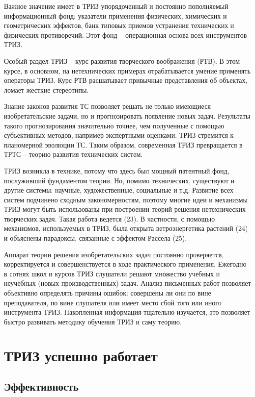 \documentclass[11pt,a4paper]{article}
\begin{document}
Важное значение имеет в ТРИЗ упорядоченный и постоянно пополняемый
информационный фонд: указатели применения физических, химических и
геометрических эффектов, банк типовых приемов устранения технических и
физических противоречий. Этот фонд -- операционная основа всех инструментов
ТРИЗ.

Особый раздел ТРИЗ -- курс развития творческого воображения (РТВ). В этом
курсе, в основном, на нетехнических примерах отрабатывается умение применять
операторы ТРИЗ. Курс РТВ расшатывает привычные представления об объектах,
ломает жесткие стереотипы.

Знание законов развития ТС позволяет решать не только имеющиеся
изобретательские задачи, но и прогнозировать появление новых задач. Результаты
такого прогнозирования значительно точнее, чем полученные с помощью
субъективных методов, например экспертными оценками. ТРИЗ стремится к
планомерной эволюции ТС. Таким образом, современная ТРИЗ превращается в ТРТС
-- теорию развития технических систем.

ТРИЗ возникла в технике, потому что здесь был мощный патентный фонд,
послуживший фундаментом теории. Но, помимо технических, существуют и другие
системы: научные, художественные, социальные и т.д. Развитие всех систем
подчинено сходным закономерностям, поэтому многие идеи и механизмы ТРИЗ могут
быть использованы при построении теорий решения нетехнических творческих
задач. Такая работа ведется (23). В частности, с помощью механизмов,
используемых в ТРИЗ, была открыта ветроэнергетика растений (24) и объяснены
парадоксы, связанные с эффектом Рассела (25).

Аппарат теории решения изобретательских задач постоянно проверяется,
корректируется и совершенствуется в ходе практического применения. Ежегодно в
сотнях школ и курсов ТРИЗ слушатели решают множество учебных и неучебных
(новых производственных) задач. Анализ письменных работ позволяет объективно
определять причины ошибок: совершены ли они по вине преподавателя, по вине
слушателя или имеет место сбой того или иного инструмента ТРИЗ. Накопленная
информация тщательно изучается, это позволяет быстро развивать методику
обучения ТРИЗ и саму теорию.

\section{ТРИЗ успешно работает}

\subsection{Эффективность}
\end{document}
